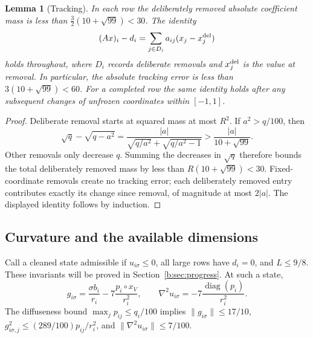 \documentclass[11pt]{amsart}
\newtheorem{lemma}[theorem]{Lemma}
\theoremstyle{definition}\newtheorem{definition}[theorem]{Definition}
\theoremstyle{remark}\newtheorem{remark}[theorem]{Remark}
\numberwithin{equation}{section}
\newcommand{\diag}{\operatorname{diag}}
\begin{document}
\begin{lemma}[Tracking]\label{b:lem:tracking}
In each row the deliberately removed absolute coefficient mass is less than
$\frac32(10+\sqrt{99})<30$. The identity
\[
 (Ax)_i-d_i=\sum_{j\in D_i}a_{ij}(x_j-x_j^{\rm del})
\]
holds throughout, where $D_i$ records deliberate removals and $x_j^{\rm del}$
is the value at removal. In particular, the absolute tracking error is less than
$3(10+\sqrt{99})<60$.
For a completed row the same identity holds after any subsequent changes of
unfrozen coordinates within $[-1,1]$.
\end{lemma}
\begin{proof}
Deliberate removal starts at squared mass at most $R^2$. If $a^2>q/100$, then
\[
 \sqrt q-\sqrt{q-a^2}
 =\frac{|a|}{\sqrt{q/a^2}+\sqrt{q/a^2-1}}
 >\frac{|a|}{10+\sqrt{99}}.
\]
Other removals only decrease $q$. Summing the decreases in $\sqrt q$
therefore bounds the total deliberately removed mass by less than
$R(10+\sqrt{99})<30$. Fixed-coordinate removals create no tracking error;
each deliberately removed entry contributes exactly its change since removal,
of magnitude at most $2|a|$. The displayed identity follows by induction.
\end{proof}


\subsection{Curvature and the available dimensions}\label{b:sec:curvature}
Call a cleaned state admissible if $u_{i\sigma}\le0$, all large rows have
$d_i=0$, and $L\le9/8$. These invariants will be proved in
Section~\ref{b:sec:progress}. At such a state,
\[
 g_{i\sigma}=\frac{\sigma b_i}{r_i}
       -7\frac{p_i\circ x_V}{r_i^2},\qquad
 \nabla^2u_{i\sigma}=-7\frac{\diag(p_i)}{r_i^2}.
\]
The diffuseness bound $\max_jp_{ij}\le q_i/100$ implies
$\|g_{i\sigma}\|\le17/10$,
$g_{i\sigma,j}^2\le(289/100)p_{ij}/r_i^2$, and
$\|\nabla^2u_{i\sigma}\|\le7/100$.
\end{document}
